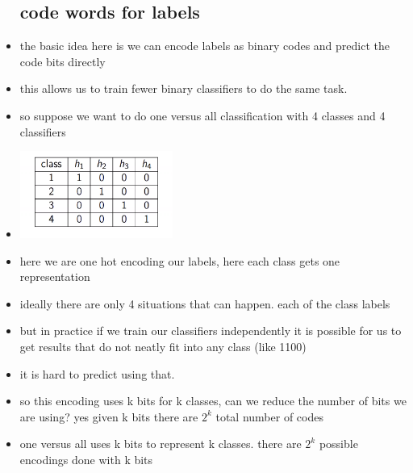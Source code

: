 \documentclass{article}
\begin{document}
\begin{itemize}
\subsection*{code words for labels}
\item the basic idea here is we can encode labels as binary codes  and predict the code bits directly 
\item this allows us to train fewer binary classifiers to do the same task. 
\item so suppose we want to do one versus all classification  with 4 classes and 4 classifiers 
\item  \includegraphics[width=5cm]{lecture_notes/lecture_8/immages/l8_5.png}
\item here we are one hot encoding our labels, here each class gets one representation 
\item ideally there are only 4 situations that can happen. each of the class labels
\item but in practice if we train our classifiers independently  it is possible for us to get results that do not neatly fit into any class  (like 1100)
\item it is hard to predict using that. 
\item so this encoding uses k bits for k classes, can we reduce the number of bits we are using? yes given k bits there are $2^k$ total number of codes 
\item one versus all uses k bits to represent k classes. there are $2^k$ possible encodings done with k bits

\end{itemize}
\end{document}
